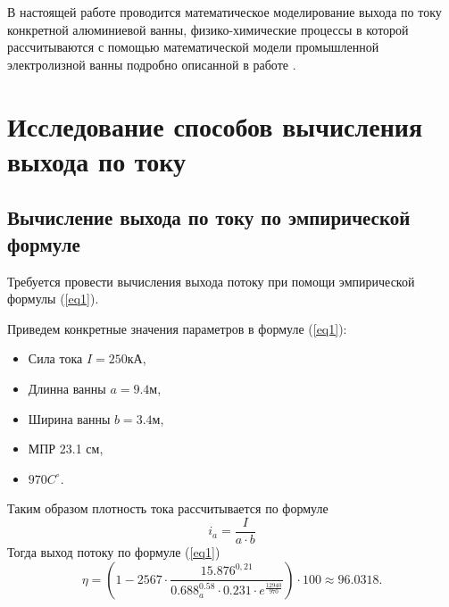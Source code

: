 \documentclass{article}
\begin{document}
В настоящей работе проводится математическое моделирование выхода по току конкретной алюминиевой ванны, физико-химические процессы в которой рассчитываются с помощью математической модели промышленной электролизной ванны подробно описанной в работе \cite{litlink:kalmykov}.

\section{Исследование способов вычисления выхода по току}

\subsection{Вычисление выхода по току по эмпирической формуле}
Требуется провести вычисления выхода потоку при помощи эмпирической формулы (\ref{eq1}).

Приведем конкретные значения параметров в формуле (\ref{eq1}):
\begin{itemize}
\item Сила тока $I=250 $кА,
\item Длинна ванны $a=9.4$м,
\item Ширина ванны $b=3.4$м,
\item МПР 23.1 см,
\item $970 C^{\circ}$.
\end{itemize}
Таким образом плотность тока рассчитывается по формуле
\begin{equation}
i_a = \frac{I}{a \cdot b}
\end{equation}
Тогда выход потоку по формуле (\ref{eq1})
\begin{equation}
\eta=(1-2567 \cdot \frac{15.876^{0,21}}{0.688^{0.58}_a \cdot 0.231 \cdot e^{\frac{12940}{970}}}) \cdot 100 \approx 96.0318.
\end{equation}
\end{document}
